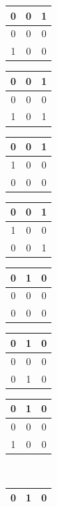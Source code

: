 \begin{center}
\begin{tabular}{|c|c|c|}
     \hline
     0&0&1\\\hline
     0&0&0\\\hline
     1&0&0\\\hline
\end{tabular}\hspace{0.3cm}
\begin{tabular}{|c|c|c|}
     \hline
     0&0&1\\\hline
     0&0&0\\\hline
     1&0&1\\\hline
\end{tabular}\hspace{0.3cm}
\begin{tabular}{|c|c|c|}
     \hline
     0&0&1\\\hline
     1&0&0\\\hline
     0&0&0\\\hline
\end{tabular}\hspace{0.3cm}
\begin{tabular}{|c|c|c|}
     \hline
     0&0&1\\\hline
     1&0&0\\\hline
     0&0&1\\\hline
\end{tabular}\hspace{0.3cm}
\begin{tabular}{|c|c|c|}
     \hline
     0&1&0\\\hline
     0&0&0\\\hline
     0&0&0\\\hline
\end{tabular}\hspace{0.3cm}
\begin{tabular}{|c|c|c|}
     \hline
     0&1&0\\\hline
     0&0&0\\\hline
     0&1&0\\\hline
\end{tabular}\hspace{0.3cm}
\begin{tabular}{|c|c|c|}
     \hline
     0&1&0\\\hline
     0&0&0\\\hline
     1&0&0\\\hline
\end{tabular}\\\vspace{0.3cm}
\begin{tabular}{|c|c|c|}
     \hline
     0&1&0\\\hline

\end{tabular}
\end{center}
